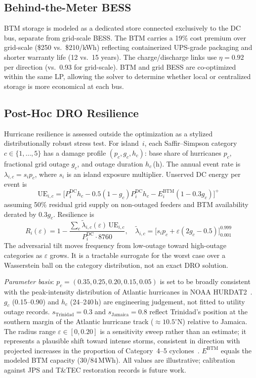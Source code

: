 \documentclass[conference,10pt]{IEEEtran}
\begin{document}
\subsection{Behind-the-Meter BESS}

BTM storage is modeled as a dedicated store connected exclusively to the DC bus, separate from grid-scale BESS. The BTM carries a 19\% cost premium over grid-scale (\$250 vs.\ \$210/kWh) reflecting containerized UPS-grade packaging and shorter warranty life (12 vs.\ 15 years). The charge/discharge links use $\eta=0.92$ per direction (vs.\ 0.93 for grid-scale). BTM and grid BESS are co-optimized within the same LP, allowing the solver to determine whether local or centralized storage is more economical at each bus.

\subsection{Post-Hoc DRO Resilience}

Hurricane resilience is assessed outside the optimization as a stylized distributionally robust stress test. For island~$i$, each Saffir--Simpson category $c\in\{1,\dots,5\}$ has a damage profile $(p_c, g_c, h_c)$: base share of hurricanes $p_c$, fractional grid outage $g_c$, and outage duration $h_c$\,(h). The annual event rate is $\lambda_{i,c}=s_i p_c$, where $s_i$ is an island exposure multiplier. Unserved DC energy per event is
\begin{equation}
\text{UE}_{i,c}=\bigl[P_i^{\text{DC}}h_c-0.5(1-g_c)P_i^{\text{DC}}h_c-E_i^{\text{BTM}}(1-0.3g_c)\bigr]^{+}
\label{eq:ue}
\end{equation}
assuming 50\% residual grid supply on non-outaged feeders and BTM availability derated by $0.3g_c$. Resilience is
\begin{equation}
R_i(\varepsilon) = 1 - \frac{\sum_c \tilde{\lambda}_{i,c}(\varepsilon)\,\text{UE}_{i,c}}{P_i^{\text{DC}} \cdot 8760},\quad \tilde{\lambda}_{i,c}=\bigl[s_i p_c+\varepsilon(2g_c-0.5)\bigr]_{0.001}^{0.999}
\label{eq:dro}
\end{equation}
The adversarial tilt moves frequency from low-outage toward high-outage categories as $\varepsilon$ grows. It is a tractable surrogate for the worst case over a Wasserstein ball on the category distribution, not an exact DRO solution.

\textit{Parameter basis}: $p_c=(0.35,0.25,0.20,0.15,0.05)$ is set to be broadly consistent with the peak-intensity distribution of Atlantic hurricanes in NOAA HURDAT2~\cite{hurdat2}. $g_c$ (0.15--0.90) and $h_c$ (24--240\,h) are engineering judgement, not fitted to utility outage records. $s_{\text{Trinidad}}=0.3$ and $s_{\text{Jamaica}}=0.8$ reflect Trinidad's position at the southern margin of the Atlantic hurricane track (${\approx}10.5^\circ$N) relative to Jamaica. The radius range $\varepsilon\in[0,0.20]$ is a sensitivity sweep rather than an estimate; it represents a plausible shift toward intense storms, consistent in direction with projected increases in the proportion of Category~4--5 cyclones~\cite{ipcc_ar6}. $E^{\text{BTM}}$ equals the modeled BTM capacity (30/84\,MWh). All values are illustrative; calibration against JPS and T\&TEC restoration records is future work.
\end{document}
